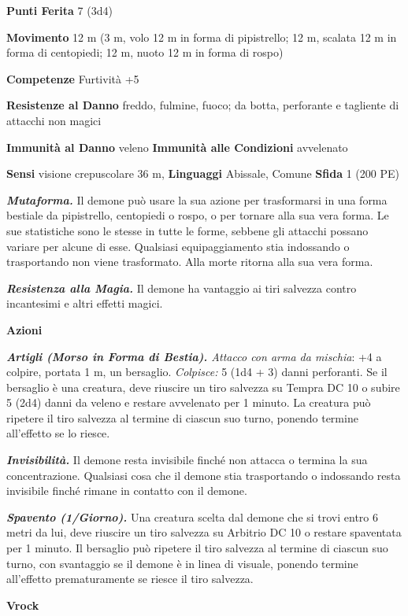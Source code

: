 \begin{multicols}{2}
\textbf{Punti Ferita} 7 (3d4)

\textbf{Movimento} 12 m (3 m, volo 12 m in forma di pipistrello; 12 m,
scalata 12 m in forma di centopiedi; 12 m, nuoto 12 m in forma di rospo)

\textbf{Competenze} Furtività +5

\textbf{Resistenze al Danno} freddo, fulmine, fuoco; da botta,
perforante e tagliente di attacchi non magici

\textbf{Immunità al Danno} veleno \textbf{Immunità alle Condizioni}
avvelenato

\textbf{Sensi} visione crepuscolare 36 m, 
\textbf{Linguaggi} Abissale, Comune \textbf{Sfida} 1 (200 PE)\smallskip

\emph{\textbf{Mutaforma.}} Il demone può usare la sua azione per
trasformarsi in una forma bestiale da pipistrello, centopiedi o rospo, o
per tornare alla sua vera forma. Le sue statistiche sono le stesse in
tutte le forme, sebbene gli attacchi possano variare per alcune di esse.
Qualsiasi equipaggiamento stia indossando o trasportando non viene
trasformato. Alla morte ritorna alla sua vera forma.

\emph{\textbf{Resistenza alla Magia.}} Il demone ha vantaggio ai tiri
salvezza contro incantesimi e altri effetti magici.

\smallskip\textbf{Azioni}

\emph{\textbf{Artigli (Morso in Forma di Bestia).} Attacco con arma da
mischia}: +4 a colpire, portata 1 m, un bersaglio. \emph{Colpisce:} 5
(1d4 + 3) danni perforanti. Se il bersaglio è una creatura, deve
riuscire un tiro salvezza su Tempra DC 10 o subire 5 (2d4) danni
da veleno e restare avvelenato per 1 minuto. La creatura può ripetere il
tiro salvezza al termine di ciascun suo turno, ponendo termine
all'effetto se lo riesce.

\emph{\textbf{Invisibilità.}} Il demone resta invisibile finché non
attacca o termina la sua concentrazione. Qualsiasi cosa che il demone
stia trasportando o indossando resta invisibile finché rimane in
contatto con il demone.

\emph{\textbf{Spavento (1/Giorno).}} Una creatura scelta dal demone che
si trovi entro 6 metri da lui, deve riuscire un tiro salvezza su Arbitrio DC 10 o restare spaventata per 1 minuto. Il bersaglio può
ripetere il tiro salvezza al termine di ciascun suo turno, con
svantaggio se il demone è in linea di visuale, ponendo termine
all'effetto prematuramente se riesce il tiro salvezza.


\textbf{Vrock}


\end{multicols}
